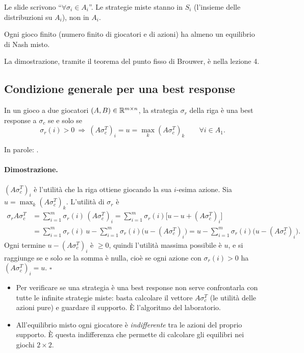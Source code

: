 \begin{attenzione}
Le slide scrivono ``$\forall \sigma_i \in A_i$''. Le strategie miste stanno in $S_i$
(l'insieme delle distribuzioni su $A_i$), non in $A_i$.
\end{attenzione}

\begin{teorema}[Nash, 1950]
Ogni gioco finito (numero finito di giocatori e di azioni) ha almeno un equilibrio di Nash
misto.
\end{teorema}
La dimostrazione, tramite il teorema del punto fisso di Brouwer, è nella lezione 4.

\subsection{Condizione generale per una best response}

\begin{teorema}
In un gioco a due giocatori $(A,B) \in \mathbb{R}^{m\times n}$, la strategia $\sigma_r$ della riga è
una best response a $\sigma_c$ se e solo se
\[
  \sigma_r(i) > 0 \ \Longrightarrow\ (A\sigma_c^T)_i = u = \max_k (A\sigma_c^T)_k
  \qquad \forall i \in A_1 .
\]
\end{teorema}
In parole: .

\paragraph{Dimostrazione.}
$(A\sigma_c^T)_i$ è l'utilità che la riga ottiene giocando la sua $i$-esima azione. Sia
$u = \max_k (A\sigma_c^T)_k$. L'utilità di $\sigma_r$ è
\begin{align*}
  \sigma_r A \sigma_c^T
  &= \sum_{i=1}^m \sigma_r(i)\,(A\sigma_c^T)_i
   = \sum_{i=1}^m \sigma_r(i)\bigl[u - u + (A\sigma_c^T)_i\bigr]\\
  &= \sum_{i=1}^m \sigma_r(i)\,u - \sum_{i=1}^m \sigma_r(i)\bigl(u - (A\sigma_c^T)_i\bigr)
   = u - \sum_{i=1}^m \sigma_r(i)\bigl(u - (A\sigma_c^T)_i\bigr).
\end{align*}
Ogni termine $u - (A\sigma_c^T)_i$ è $\ge 0$, quindi l'utilità massima possibile è $u$, e
si raggiunge se e solo se la somma è nulla, cioè se ogni azione con $\sigma_r(i) > 0$ ha
$(A\sigma_c^T)_i = u$. $\square$

\begin{osservazione}
\begin{itemize}
  \item Per verificare se una strategia è una best response non serve confrontarla con
        tutte le infinite strategie miste: basta calcolare il vettore $A\sigma_c^T$
        (le utilità delle azioni pure) e guardare il supporto. È l'algoritmo del laboratorio.
  \item All'equilibrio misto ogni giocatore è \emph{indifferente} tra le azioni del
        proprio supporto. È questa indifferenza che permette di calcolare gli equilibri nei
        giochi $2\times2$.
\end{itemize}
\end{osservazione}

